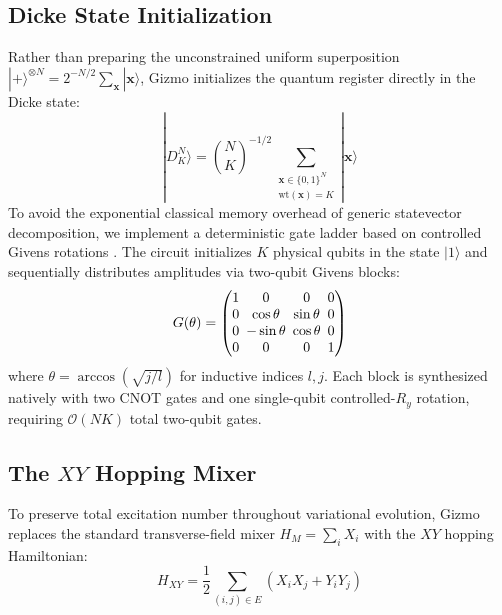 \documentclass[10pt,twocolumn]{article}
\begin{document}
\subsection{Dicke State Initialization}
Rather than preparing the unconstrained uniform superposition $|+\rangle^{\otimes N} = 2^{-N/2} \sum_{\mathbf{x}} |\mathbf{x}\rangle$, Gizmo initializes the quantum register directly in the Dicke state:
\begin{equation}
|D_K^N\rangle = \binom{N}{K}^{-1/2} \sum_{\substack{\mathbf{x} \in \{0, 1\}^N \\ \text{wt}(\mathbf{x}) = K}} |\mathbf{x}\rangle
\end{equation}
To avoid the exponential classical memory overhead of generic statevector decomposition, we implement a deterministic gate ladder based on controlled Givens rotations \cite{bartschi2019}. The circuit initializes $K$ physical qubits in the state $|1\rangle$ and sequentially distributes amplitudes via two-qubit Givens blocks:
\begin{equation}
\setlength{\arraycolsep}{2.5pt}
G(\theta) = \begin{pmatrix} 1 & 0 & 0 & 0 \\ 0 & \cos\theta & \sin\theta & 0 \\ 0 & -\sin\theta & \cos\theta & 0 \\ 0 & 0 & 0 & 1 \end{pmatrix}
\end{equation}
where $\theta = \arccos(\sqrt{j / l})$ for inductive indices $l, j$. Each block is synthesized natively with two CNOT gates and one single-qubit controlled-$R_y$ rotation, requiring $\mathcal{O}(NK)$ total two-qubit gates.

\subsection{The \texorpdfstring{$XY$}{XY} Hopping Mixer}
To preserve total excitation number throughout variational evolution, Gizmo replaces the standard transverse-field mixer $H_M = \sum_i X_i$ with the $XY$ hopping Hamiltonian:
\begin{equation}
H_{XY} = \frac{1}{2} \sum_{(i, j) \in E} \left( X_i X_j + Y_i Y_j \right)
\end{equation}
\end{document}
